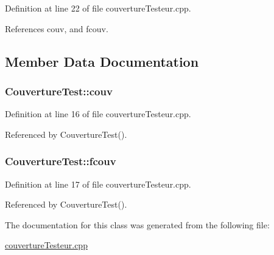 Definition at line 22 of file couvertureTesteur.cpp.



References couv, and fcouv.



\subsection{Member Data Documentation}
\hypertarget{class_couverture_test_a7f919ac5acfe9d8162c2dd717056c137}{
\subsubsection[{couv}]{ {\bf CouvertureTest::couv}}}
\label{class_couverture_test_a7f919ac5acfe9d8162c2dd717056c137}


Definition at line 16 of file couvertureTesteur.cpp.



Referenced by CouvertureTest().

\hypertarget{class_couverture_test_aad668571fb2d0b923efb5aaa64f925bc}{
\subsubsection[{fcouv}]{ {\bf CouvertureTest::fcouv}}}
\label{class_couverture_test_aad668571fb2d0b923efb5aaa64f925bc}


Definition at line 17 of file couvertureTesteur.cpp.



Referenced by CouvertureTest().



The documentation for this class was generated from the following file:\begin{DoxyCompactItemize}
\item 
\hyperlink{couverture_testeur_8cpp}{couvertureTesteur.cpp}\end{DoxyCompactItemize}
